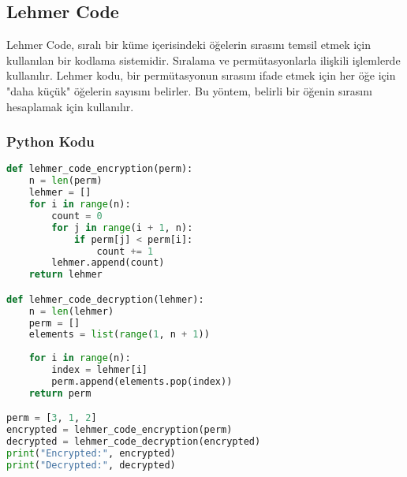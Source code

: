 \newpage

\subsection{Lehmer Code}

Lehmer Code, sıralı bir küme içerisindeki öğelerin sırasını temsil etmek için kullanılan bir kodlama sistemidir. Sıralama ve permütasyonlarla ilişkili işlemlerde kullanılır. Lehmer kodu, bir permütasyonun sırasını ifade etmek için her öğe için "daha küçük" öğelerin sayısını belirler. Bu yöntem, belirli bir öğenin sırasını hesaplamak için kullanılır.

\subsubsection{Python Kodu}

\begin{lstlisting}[language=Python]
def lehmer_code_encryption(perm):
    n = len(perm)
    lehmer = []
    for i in range(n):
        count = 0
        for j in range(i + 1, n):
            if perm[j] < perm[i]:
                count += 1
        lehmer.append(count)
    return lehmer

def lehmer_code_decryption(lehmer):
    n = len(lehmer)
    perm = []
    elements = list(range(1, n + 1))
    
    for i in range(n):
        index = lehmer[i]
        perm.append(elements.pop(index))
    return perm

perm = [3, 1, 2]
encrypted = lehmer_code_encryption(perm)
decrypted = lehmer_code_decryption(encrypted)
print("Encrypted:", encrypted)
print("Decrypted:", decrypted)
\end{lstlisting}

\newpage